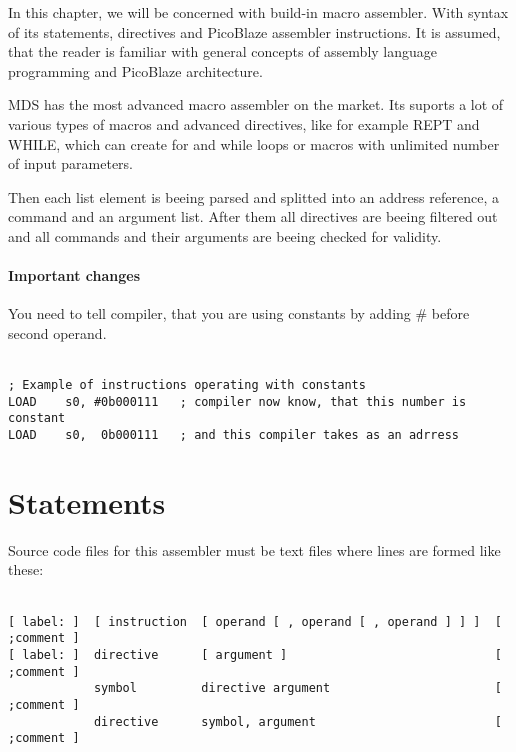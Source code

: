 In this chapter, we will be concerned with build-in macro assembler. With syntax of its statements, directives and PicoBlaze assembler instructions. It is assumed, that the reader is familiar with general concepts of assembly language programming and PicoBlaze architecture.

MDS has the most advanced macro assembler on the market. Its suports a lot of various types of macros and advanced directives, like for example REPT and WHILE, which can create for and while loops or  macros with unlimited number of input parameters.

Then each list element is beeing parsed and splitted into an address reference, a command and an argument list. After them all directives are beeing filtered out and all commands and their arguments are beeing checked for validity.

\paragraph{Important changes}
    You need to tell compiler, that you are using constants by adding \# before second operand.

    {
        ~\\
        \usecodefont
        \verb'; Example of instructions operating with constants'\\
        \verb'LOAD    s0, #0b000111   ; compiler now know, that this number is constant'\\
        \verb'LOAD    s0,  0b000111   ; and this compiler takes as an adrress'\\
    }

\section{Statements}
    Source code files for this assembler must be text files where lines are formed like these:

    {
        ~\\
        \usecodefont
        \verb'[ label: ]  [ instruction  [ operand [ , operand [ , operand ] ] ]  [ ;comment ]'\\
        \verb'[ label: ]  directive      [ argument ]                             [ ;comment ]'\\
        \verb'            symbol         directive argument                       [ ;comment ]'\\
        \verb'            directive      symbol, argument                         [ ;comment ]'\\
    }

